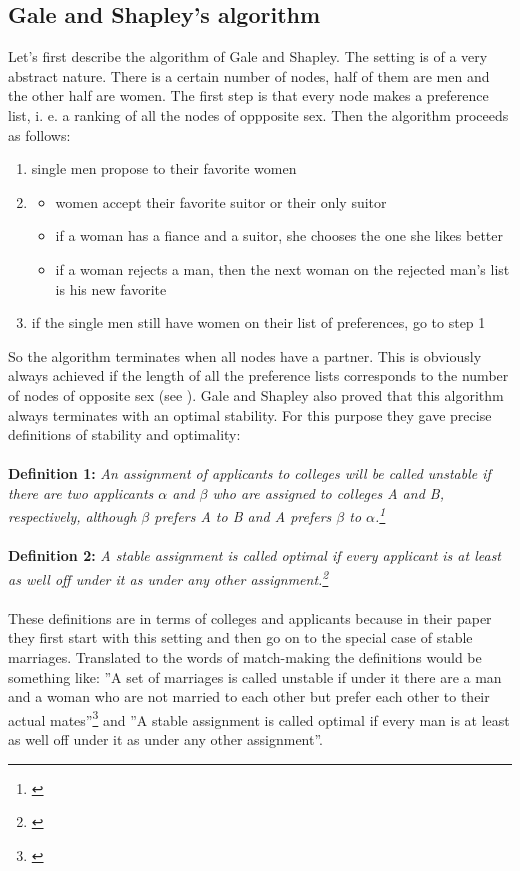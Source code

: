 \documentclass[11pt]{article}
\begin{document}
\subsection{Gale and Shapley's algorithm}

Let's first describe the algorithm of Gale and Shapley. The setting is of a very abstract nature. There is a certain number of nodes, half of
them are men and the other half are women. The first step is that every node makes a preference list, i. e. a ranking of all the nodes of oppposite
sex. Then the algorithm proceeds as follows:
\begin{enumerate}
  \item single men propose to their favorite women
  \item
  \begin{itemize}
    \item women accept their favorite suitor or their only suitor
    \item if a woman has a fiance and a suitor, she chooses the one she likes better
    \item if a woman rejects a man, then the next woman on the rejected man's list is his new favorite
  \end{itemize}
  \item if the single men still have women on their list of preferences, go to step 1
\end{enumerate}
So the algorithm terminates when all nodes have a partner. This is obviously always achieved if the length of all the preference lists
corresponds to the number of nodes of opposite sex (see \citet[p. 14, Theorem 1]{1962}).
Gale and Shapley also proved that this algorithm always terminates with an optimal stability. For this purpose they gave precise definitions
of stability and optimality:
\\
\\
\textbf{Definition 1: }\textit{An assignment of applicants to colleges will be called unstable if there are two applicants
 $\alpha$ and $\beta$ who are assigned to colleges A and B, respectively, although $\beta$ prefers A to B and A prefers $\beta$
  to $\alpha$.\footnote{\citet[p. 10]{1962}}}
\label{eq:stable}
\\
\\
\textbf{Definition 2: }\textit{A stable assignment is called optimal if every applicant is at
least as well off under it as under any other assignment.\footnote{\citet[p. 10]{1962}}}
\label{eq:optimal}
\\
\\
These definitions are in terms of colleges and applicants because in their paper they first start with this setting and then go on to the
special case of stable marriages. Translated to the words of match-making the definitions would be something like: ''A set of marriages is called
unstable if under it there are a man and a woman who are not married to each other but prefer each other to their actual mates''\footnote{\citet[p. 11]{1962}}
and ''A stable assignment is called optimal if every man is at least as well off under it as under any other assignment''. 
\end{document}
